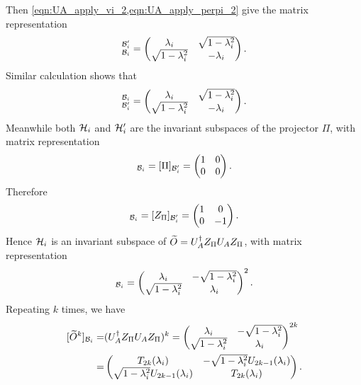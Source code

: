 Then \cref{eqn:UA_apply_vi_2,eqn:UA_apply_perpi_2} give the matrix representation
\begin{equation}
[U_A]_{\mc{B}_i}^{\mc{B}_i'}=\begin{pmatrix}
\lambda_i & \sqrt{1-\lambda_i^2}\\
\sqrt{1-\lambda_i^2} & -\lambda_i
\end{pmatrix}.
\end{equation}
Similar calculation shows that
\begin{equation}
[U^{\dag}_A]_{\mc{B}_i'}^{\mc{B}_i}=\begin{pmatrix}
\lambda_i & \sqrt{1-\lambda_i^2}\\
\sqrt{1-\lambda_i^2} & -\lambda_i
\end{pmatrix}.
\end{equation}
Meanwhile both $\mathcal{H}_i$ and $\mathcal{H}_i'$ are the invariant subspaces of the projector $\Pi$, with matrix representation
\begin{equation}
[\Pi]_{\mc{B}_i}=[\Pi]_{\mc{B}_i'}=\begin{pmatrix}
1 & 0 \\
0 & 0
\end{pmatrix}.
\end{equation}
Therefore
\begin{equation}
[Z_\Pi]_{\mc{B}_i}=[Z_\Pi]_{\mc{B}_i'}=\begin{pmatrix}
1 & 0 \\
0 & -1
\end{pmatrix}.
\end{equation}
Hence $\mathcal{H}_i$ is an invariant subspace of $\widetilde{O}=U_A^{\dag}Z_{\Pi}U_A Z_{\Pi}$, with matrix representation
\begin{equation}
[\wt{O}]_{\mc{B}_i}=\begin{pmatrix}
\lambda_i & -\sqrt{1-\lambda_i^2}\\
\sqrt{1-\lambda_i^2} & \lambda_i
\end{pmatrix}^2.
\end{equation}
Repeating $k$ times, we have
\begin{equation}
\begin{split}
[\widetilde{O}^k]_{\mathcal{B}_i}=&(U_A^{\dag}Z_{\Pi}U_A Z_{\Pi})^{k}=\begin{pmatrix}
\lambda_i & -\sqrt{1-\lambda_i^2}\\
\sqrt{1-\lambda_i^2} & \lambda_i
\end{pmatrix}^{2k}\\
=&\begin{pmatrix}
T_{2k}(\lambda_i) & -\sqrt{1-\lambda_i^2}U_{2k-1}(\lambda_i)\\
\sqrt{1-\lambda_i^2}U_{2k-1}(\lambda_i) & T_{2k}(\lambda_i)
\end{pmatrix}.
\end{split}
\end{equation}
